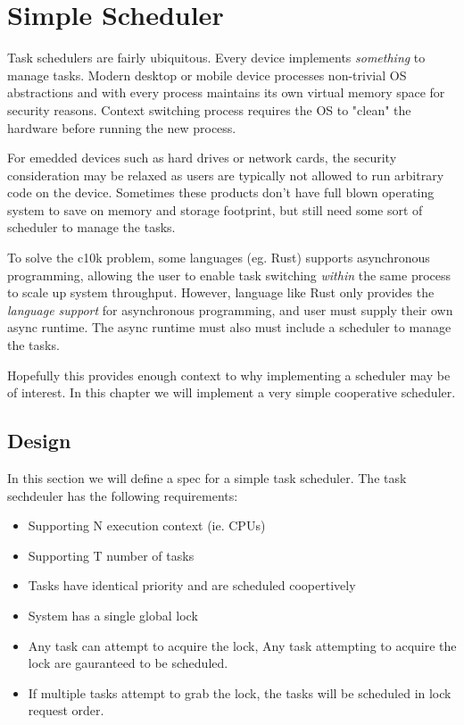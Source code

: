% 

\chapter{Simple Scheduler}

Task schedulers are fairly ubiquitous. Every device implements
\textit{something} to manage tasks. Modern desktop or mobile device processes
non-trivial OS abstractions and with every process maintains its own virtual
memory space for security reasons. Context switching process requires the OS to
"clean" the hardware before running the new process.\newline

For emedded devices such as hard drives or network cards, the security
consideration may be relaxed as users are typically not allowed to run arbitrary
code on the device. Sometimes these products don't have full blown operating
system to save on memory and storage footprint, but still need some sort of
scheduler to manage the tasks.\newline

To solve the c10k \cite{c10k} problem, some languages (eg. Rust) supports
asynchronous programming, allowing the user to enable task switching 
\textit{within} the same process to scale up system throughput.  However,
language like Rust only provides the \textit{language support} for asynchronous
programming, and user must supply their own async runtime. The async runtime
must also must include a scheduler to manage the tasks.\newline

Hopefully this provides enough context to why implementing a scheduler may be of
interest. In this chapter we will implement a very simple cooperative
scheduler.

\section{Design}

In this section we will define a spec for a simple task scheduler. The task sechdeuler has the following
requirements:
\begin{itemize}
    \item Supporting N execution context (ie. CPUs)
    \item Supporting T number of tasks
    \item Tasks have identical priority and are scheduled coopertively
    \item System has a single global lock
    \item Any task can attempt to acquire the lock, Any task attempting to
    acquire the lock are gauranteed to be scheduled.
    \item If multiple tasks attempt to grab the lock, the tasks will be
    scheduled in lock request order. 
\end{itemize}

